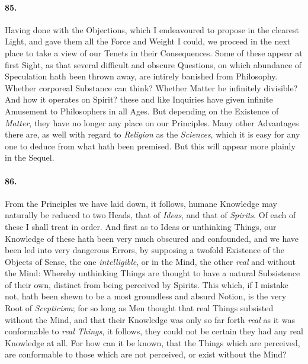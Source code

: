 \documentclass[]{article}
\newenvironment{sectionbody}{\begin{multicols}{2}}{\end{multicols}}
\begin{document}
\begin{sectionbody}
\paragraph{85.} Having done with the Objections, which I endeavoured to propose
in the clearest Light, and gave them all the Force and Weight I
could, we proceed in the next place to take a view of our Tenets
in their Consequences.  Some of these appear at first Sight, as
that several difficult and obscure Questions, on which abundance
of Speculation hath been thrown away, are intirely banished from
Philosophy.  Whether corporeal Substance can think?  Whether
Matter be infinitely divisible?  And how it operates on Spirit?
these and like Inquiries have given infinite Amusement to
Philosophers in all Ages.  But depending on the Existence of
\emph{Matter}, they have no longer any place on our Principles.
Many other Advantages there are, as well with regard to
\emph{Religion} as the \emph{Sciences}, which it is easy for
any one to deduce from what hath been premised.  But this will
appear more plainly in the Sequel.



\paragraph{86.} From the Principles we have laid down, it follows, humane
Knowledge may naturally be reduced to two Heads, that of
\emph{Ideas}, and that of \emph{Spirits}.  Of each of these I
shall treat in order.  And first as to Ideas or unthinking
Things, our Knowledge of these hath been very much obscured and
confounded, and we have been led into very dangerous Errors, by
supposing a twofold Existence of the Objects of Sense, the one
\emph{intelligible}, or in the Mind, the other \emph{real}
and without the Mind: Whereby unthinking Things are thought to
have a natural Subsistence of their own, distinct from being
perceived by Spirits.  This which, if I mistake not, hath been
shewn to be a most groundless and absurd Notion, is the very Root
of \emph{Scepticism}; for so long as Men thought that real
Things subsisted without the Mind, and that their Knowledge was
only so far forth \emph{real} as it was conformable to \emph{real
Things}, it follows, they could not be certain they had any
real Knowledge at all.  For how can it be known, that the Things
which are perceived, are conformable to those which are not
perceived, or exist without the Mind?




\end{sectionbody}
\end{document}
